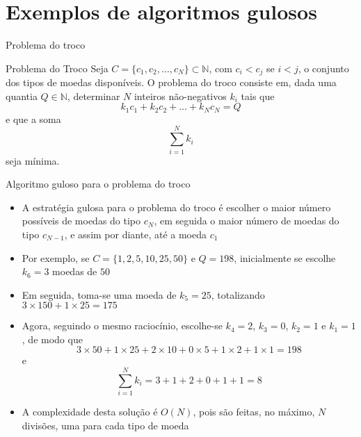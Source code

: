 \section{Exemplos de algoritmos gulosos}

\begin{frame}[fragile]{Problema do troco}

    \begin{block}{Problema do Troco}
        Seja $C = \lbrace c_1, c_2, \ldots, c_N\rbrace\subset \mathbb{N}$, com $c_i < c_j$ se 
        $i < j$, o conjunto dos tipos de moedas disponíveis.
        O problema do troco consiste em, dada uma quantia $Q\in\mathbb{N}$, determinar $N$ inteiros 
        não-negativos $k_i$ tais que
        \[
            k_1c_1 + k_2c_2 + \ldots + k_Nc_N = Q
        \] e que a soma
        \[
            \sum_{i = 1}^N k_i
        \]
        seja mínima.
    \end{block}

\end{frame}

\begin{frame}[fragile]{Algoritmo guloso para o problema do troco}

    \begin{itemize}
        \item A estratégia gulosa para o problema do troco é escolher o maior número possíveis
            de moedas do tipo $c_N$, em seguida o maior número de moedas do tipo $c_{N - 1}$,
            e assim por diante, até a moeda $c_1$

        \item Por exemplo, se $C = \lbrace 1, 2, 5, 10, 25, 50\rbrace$ e $Q = 198$, inicialmente
            se escolhe $k_6 = 3$ moedas de $50$

        \item Em seguida, toma-se uma moeda de $k_5 = 25$, totalizando $3\times 150 + 1\times 25 
            = 175$

        \item Agora, seguindo o mesmo raciocínio, escolhe-se $k_4 = 2$, $k_3 = 0$, $k_2 = 1$ e 
            $k_1 = 1$, de modo que
        \[
            3\times 50 + 1\times 25 + 2\times 10 + 0\times 5 + 1\times 2 + 1\times 1 = 198
        \]
        e
        \[
            \sum_{i = 1}^N k_i = 3 + 1 + 2 + 0 + 1 + 1 = 8
        \]

        \item A complexidade desta solução é $O(N)$, pois são feitas, no máximo, $N$ divisões,
            uma para cada tipo de moeda
            
    \end{itemize}

\end{frame}

